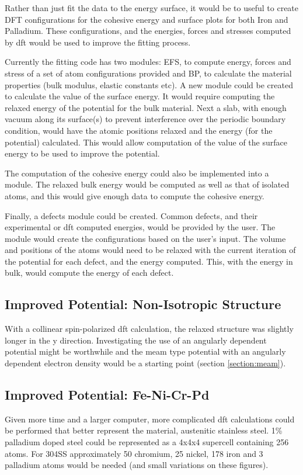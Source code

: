 Rather than just fit the data to the energy surface, it would be to useful to create DFT configurations for the cohesive energy and surface plots for both Iron and Palladium.  These configurations, and the energies, forces and stresses computed by \acrshort{dft} would be used to improve the fitting process.

Currently the fitting code has two modules: EFS, to compute energy, forces and stress of a set of atom configurations provided and BP, to calculate the material properties (bulk modulus, elastic constants etc).  A new module could be created to calculate the value of the surface energy.  It would require computing the relaxed energy of the potential for the bulk material.  Next a slab, with enough vacuum along its surface(s) to prevent interference over the periodic boundary condition, would have the atomic positions relaxed and the energy (for the potential) calculated.  This would allow computation of the value of the surface energy to be used to improve the potential.

The computation of the cohesive energy could also be implemented into a module.  The relaxed bulk energy would be computed as well as that of isolated atoms, and this would give enough data to compute the cohesive energy.

Finally, a defects module could be created.  Common defects, and their experimental or \acrshort{dft} computed energies, would be provided by the user.  The module would create the configurations based on the user's input.  The volume and positions of the atoms would need to be relaxed with the current iteration of the potential for each defect, and the energy computed.  This, with the energy in bulk, would compute the energy of each defect.


\subsection{Improved Potential: Non-Isotropic Structure}

With a collinear spin-polarized \acrshort{dft} calculation, the relaxed structure was slightly longer in the y direction.  Investigating the use of an angularly dependent potential might be worthwhile and the \acrshort{meam} type potential with an angularly dependent electron density would be a starting point (section \ref{section:meam}).

\subsection{Improved Potential: Fe-Ni-Cr-Pd}

Given more time and a larger computer, more complicated \acrshort{dft} calculations could be performed that better represent the material, austenitic stainless steel.  1\% palladium doped steel could be represented as a 4x4x4 supercell containing 256 atoms.  For \gls{304SS} approximately 50 chromium, 25 nickel, 178 iron and 3 palladium atoms would be needed (and small variations on these figures).


